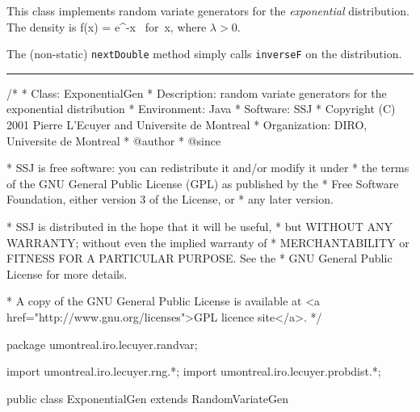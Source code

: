 
This class implements random variate generators for the 
{\em exponential\/} distribution. The density is
\eq
  f(x) = \lambda e^{-\lambda x} \qquad\mbox{ for }x,
\endeq
where $\lambda > 0$.

The (non-static) \texttt{nextDouble} method simply calls \texttt{inverseF} on the
distribution. 

\bigskip\hrule

\begin{code}
\begin{hide}
/*
 * Class:        ExponentialGen
 * Description:  random variate generators for the exponential distribution
 * Environment:  Java
 * Software:     SSJ 
 * Copyright (C) 2001  Pierre L'Ecuyer and Universite de Montreal
 * Organization: DIRO, Universite de Montreal
 * @author       
 * @since

 * SSJ is free software: you can redistribute it and/or modify it under
 * the terms of the GNU General Public License (GPL) as published by the
 * Free Software Foundation, either version 3 of the License, or
 * any later version.

 * SSJ is distributed in the hope that it will be useful,
 * but WITHOUT ANY WARRANTY; without even the implied warranty of
 * MERCHANTABILITY or FITNESS FOR A PARTICULAR PURPOSE.  See the
 * GNU General Public License for more details.

 * A copy of the GNU General Public License is available at
   <a href="http://www.gnu.org/licenses">GPL licence site</a>.
 */
\end{hide}
package umontreal.iro.lecuyer.randvar;\begin{hide}
import umontreal.iro.lecuyer.rng.*;
import umontreal.iro.lecuyer.probdist.*;
\end{hide}

public class ExponentialGen extends RandomVariateGen \begin{hide} {
   protected double lambda; 

\end{hide}\end{code}

